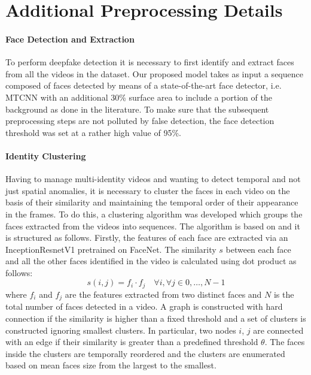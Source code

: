 \documentclass[10pt,twocolumn,letterpaper]{article}
\begin{document}
{\small
\balance


}




\appendix
\section{Additional Preprocessing Details}
\paragraph{Face Detection and Extraction} To perform deepfake detection it is necessary to first identify and extract faces from all the videos in the dataset. Our proposed model takes as input a sequence composed of faces detected by means of a state-of-the-art face detector, i.e. MTCNN\cite{mtcnn} with an additional 30\% surface area to include a portion of the background as done in the literature\cite{10.1007/978-3-031-06433-3_19, meverdeepfake}.
To make sure that the subsequent preprocessing steps are not polluted by false detection, the face detection threshold was set at a rather high value of 95\%.
\paragraph{Identity Clustering} Having to manage multi-identity videos and wanting to detect temporal and not just spatial anomalies, it is necessary to cluster the faces in each video on the basis of their similarity and maintaining the temporal order of their appearance in the frames. To do this, a clustering algorithm was developed which groups the faces extracted from the videos into sequences. 
The algorithm is based on \cite{preprocessing} and it is structured as follows. Firstly, the features of each face are extracted via an InceptionResnetV1 pretrained on FaceNet\cite{facenet}. The similarity $s$ between each face and all the other faces identified in the video is calculated using dot product as follows:
$$s(i,j) =f_i \cdot f_j \quad \forall i, \forall j \in {0,\ldots,N-1}$$
where $f_i$ and $f_j$ are the features extracted from two distinct faces and $N$ is the total number of faces detected in a video.
A graph is constructed with hard connection if the similarity is higher than a fixed threshold and a set of clusters is constructed ignoring smallest clusters. In particular, two nodes $i$, $j$ are connected with an edge if their similarity is greater than a predefined threshold $\theta$\cite{preprocessing}. The faces inside the clusters are temporally reordered and the clusters are enumerated based on mean faces size from the largest to the smallest.
\end{document}
